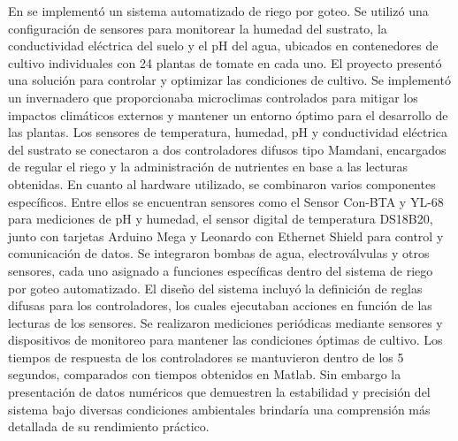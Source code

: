 \bigbreak
En \cite{lema_holguin_implementacion_2018} se implementó un sistema automatizado de riego por goteo. Se utilizó una configuración de sensores para monitorear la humedad del sustrato, la conductividad eléctrica del suelo y el pH del agua, ubicados en contenedores de cultivo individuales con 24 plantas de tomate en cada uno. El proyecto presentó una solución para controlar y optimizar las condiciones de cultivo. Se implementó un invernadero que proporcionaba microclimas controlados para mitigar los impactos climáticos externos y mantener un entorno óptimo para el desarrollo de las plantas. Los sensores de temperatura, humedad, pH y conductividad eléctrica del sustrato se conectaron a dos controladores difusos tipo Mamdani, encargados de regular el riego y la administración de nutrientes en base a las lecturas obtenidas. En cuanto al hardware utilizado, se combinaron varios componentes específicos. Entre ellos se encuentran sensores como el Sensor Con-BTA y YL-68 para mediciones de pH y humedad, el sensor digital de temperatura DS18B20, junto con tarjetas Arduino Mega y Leonardo con Ethernet Shield para control y comunicación de datos. Se integraron bombas de agua, electroválvulas y otros sensores, cada uno asignado a funciones específicas dentro del sistema de riego por goteo automatizado. El diseño del sistema incluyó la definición de reglas difusas para los controladores, los cuales ejecutaban acciones en función de las lecturas de los sensores. Se realizaron mediciones periódicas mediante sensores y dispositivos de monitoreo para mantener las condiciones óptimas de cultivo. Los tiempos de respuesta de los controladores se mantuvieron dentro de los 5 segundos, comparados con tiempos obtenidos en Matlab. Sin embargo la presentación de datos numéricos que demuestren la estabilidad y precisión del sistema bajo diversas condiciones ambientales brindaría una comprensión más detallada de su rendimiento práctico.

